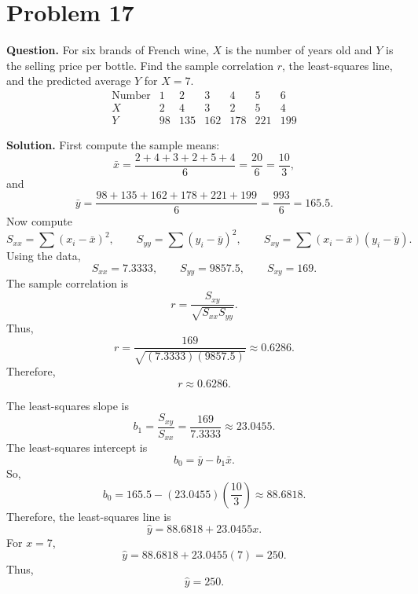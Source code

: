 \documentclass[11pt]{article}
\begin{document}
\section*{Problem 17}

\textbf{Question.} For six brands of French wine, $X$ is the number of years old and $Y$ is the selling price per bottle. Find the sample correlation $r$, the least-squares line, and the predicted average $Y$ for $X=7$.
\[
\begin{array}{c|cccccc}
\text{Number} & 1 & 2 & 3 & 4 & 5 & 6\\
\hline
X & 2 & 4 & 3 & 2 & 5 & 4\\
Y & 98 & 135 & 162 & 178 & 221 & 199
\end{array}
\]

\textbf{Solution.} First compute the sample means:
\[
\bar x=\frac{2+4+3+2+5+4}{6}=\frac{20}{6}=\frac{10}{3},
\]
and
\[
\bar y=\frac{98+135+162+178+221+199}{6}=\frac{993}{6}=165.5.
\]
Now compute
\[
S_{xx}=\sum (x_i-\bar x)^2, \qquad S_{yy}=\sum (y_i-\bar y)^2, \qquad S_{xy}=\sum (x_i-\bar x)(y_i-\bar y).
\]
Using the data,
\[
S_{xx}=7.3333, \qquad S_{yy}=9857.5, \qquad S_{xy}=169.
\]
The sample correlation is
\[
r=\frac{S_{xy}}{\sqrt{S_{xx}S_{yy}}}.
\]
Thus,
\[
r=\frac{169}{\sqrt{(7.3333)(9857.5)}}\approx 0.6286.
\]
Therefore,
\[
\boxed{r\approx 0.6286}.
\]

The least-squares slope is
\[
b_1=\frac{S_{xy}}{S_{xx}}=\frac{169}{7.3333}\approx 23.0455.
\]
The least-squares intercept is
\[
b_0=\bar y-b_1\bar x.
\]
So,
\[
b_0=165.5-(23.0455)\left(\frac{10}{3}\right)\approx 88.6818.
\]
Therefore, the least-squares line is
\[
\boxed{\hat y=88.6818+23.0455x}.
\]
For $x=7$,
\[
\hat y=88.6818+23.0455(7)=250.
\]
Thus,
\[
\boxed{\hat y=250}.
\]

\newpage
\end{document}
